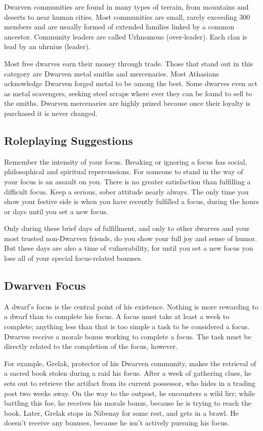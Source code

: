 Dwarven communities are found in many types of terrain, from mountains and deserts to near human cities. Most communities are small, rarely exceeding 300 members and are usually formed of extended families linked by a common ancestor. Community leaders are called Urhnomous (over-leader). Each clan is lead by an uhrnius (leader).

Most free dwarves earn their money through trade. Those that stand out in this category are Dwarven metal smiths and mercenaries. Most Athasians acknowledge Dwarven forged metal to be among the best. Some dwarves even act as metal scavengers, seeking steel scraps where ever they can be found to sell to the smiths. Dwarven mercenaries are highly prized because once their loyalty is purchased it is never changed.

\subsection{Roleplaying Suggestions}
Remember the intensity of your focus. Breaking or ignoring a focus has social, philosophical and spiritual repercussions. For someone to stand in the way of your focus is an assault on you. There is no greater satisfaction than fulfilling a difficult focus. Keep a serious, sober attitude nearly always. The only time you show your festive side is when you have recently fulfilled a focus, during the hours or days until you set a new focus.

Only during these brief days of fulfillment, and only to other dwarves and your most trusted non-Dwarven friends, do you show your full joy and sense of humor. But these days are also a time of vulnerability, for until you set a new focus you lose all of your special focus-related bonuses.

\subsection{Dwarven Focus}

A dwarf's focus is the central point of his existence. Nothing is more rewarding to a dwarf than to complete his focus. A focus must take at least a week to complete; anything less than that is too simple a task to be considered a focus. Dwarves receive a morale bonus working to complete a focus. The task must be directly related to the completion of the focus, however.

For example, Grelak, protector of his Dwarven community, makes the retrieval of a sacred book stolen during a raid his focus. After a week of gathering clues, he sets out to retrieve the artifact from its current possessor, who hides in a trading post two weeks away. On the way to the outpost, he encounters a wild lirr; while battling this foe, he receives his morale bonus, because he is trying to reach the book. Later, Grelak stops in Nibenay for some rest, and gets in a brawl. He doesn't receive any bonuses, because he isn't actively pursuing his focus.

